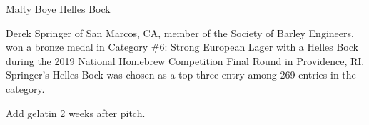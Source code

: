 \stylesection{\stylemaibock}

\begin{recipie}{Malty Boye Helles Bock}

\begin{aboutblock}
Derek Springer of San Marcos, CA, member of the Society of Barley Engineers, won a
bronze medal in Category \#6: Strong European Lager with a Helles Bock during the 2019
National Homebrew Competition Final Round in Providence, RI. Springer's Helles Bock was
chosen as a top three entry among 269 entries in the category. \sourceaha
\end{aboutblock}


\begin{methodandtiming}
 
\begin{mashsteps}
\end{mashsteps}

\begin{fermentationsteps}
\end{fermentationsteps}

\begin{directions}
Add gelatin 2 weeks after pitch.
\end{directions}

\end{methodandtiming}

\pagebreak

\begin{ingredientsblock}

\begin{malts}
\end{malts}

\begin{hops}
\end{hops}


\end{ingredientsblock}

\end{recipie}

